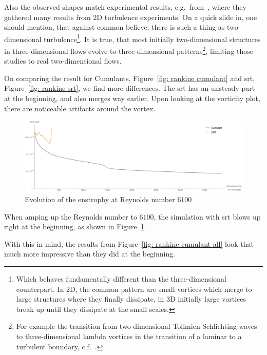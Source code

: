 Also the observed shapes match experimental results, e.g.\ from~\cite{tabeling2002two}, where they gathered many results from 2D turbulence experiments.
On a quick slide in, one should mention, that against common believe, there is such a thing as two-dimensional turbulence\footnote{Which behaves fundamentally different than the three-dimensional counterpart. In 2D, the common pattern are small vortices which merge to large structures where they finally dissipate, in 3D initially large vortices break up until they dissipate at the small scales.}.
It is true, that most initially two-dimensional structures in three-dimensional flows evolve to three-dimensional patterns\footnote{For
example the transition from two-dimensional Tollmien-Schlichting waves to  three-dimensional lambda vortices in the transition of a laminar to a turbulent boundary, c.f.~\cite{knörnschild2001untersuchungen}.},
limiting those studies to real two-dimensional flows.

On comparing the result for Cumulants, Figure~\ref{fig: rankine cumulant} and \gls{srt}, Figure~\ref{fig: rankine srt}, we find more differences.
The \gls{srt} has an unsteady part at the beginning, and also merges way earlier.
Upon looking at the vorticity plot, there are noticeable artifacts around the vortex.

\begin{figure}
  \centering
  \includegraphics[width=\textwidth]{../figures/vortexMerge_enstrophy6100.pdf}  %
  \caption{Evolution of the enstrophy at Reynolds number $6100$}
\label{fig: rankine 6100}
\end{figure}
When amping up the Reynolds number to $6100$, the simulation with \gls{srt} blows up right at the beginning, as shown in Figure~\ref{fig: rankine 6100}.

With this in mind, the results from Figure~\ref{fig: rankine cumulant all} look that much more impressive than they did at the beginning.
